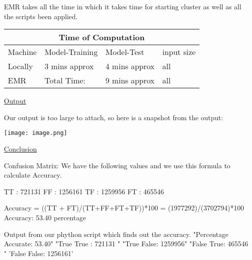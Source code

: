 \documentclass{article}
\begin{document}
EMR takes all the time in which it takes time for starting cluster as well as all the scripts been applied.
\vspace{1.2cm}
\begin{tabular}{ |p{2.5cm}||p{2.5cm}|p{2.5cm}|p{2.5cm}|  }
 \hline
 \multicolumn{4}{|c|}{Time of  Computation} \\
 \hline
 Machine & Model-Training & Model-Test & input size\\
 \hline
Locally & 3 mins approx & 4 mins approx& all\\
 \hline
EMR & Total Time:  & 9 mins approx & all\\
\hline
\end{tabular}

\vspace{1.2cm}
\vspace{1.2cm}



\newpage
\huge

\begin{center}
\underline{Output} 
\end{center}
Our output is too large to attach, so here is a snapshot from the output:

\vspace{1.2cm}
\texttt{[image: image.png]}


\newpage
\huge

\begin{center}
\underline{Conclusion} 
\end{center}
Confusion Matrix: 
We have the following values and we use this formula to calculate Accuracy.

TT : 721131
\linebreak
FF : 1256161 
\linebreak
TF : 1259956 
\linebreak
FT : 465546 
\linebreak

Accuracy = ((TT + FT)/(TT+FF+FT+TF))*100
\newline
         = (1977292)/(3702794)*100
         \linebreak
Accuracy: 53.40 percentage 

Output from our phython script which finds out the accuracy. 
\newline
	"Percentage Accurate:  53.40" 
	\newline
	"True True : 721131 " 
	\newline
	"True False: 1259956"  
	\newline
	"False True: 465546 " 
	\newline
	'False False: 1256161' 
	\newline
\end{document}
